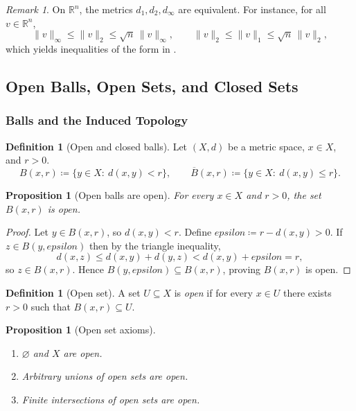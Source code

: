 \documentclass[12pt]{article}
\numberwithin{equation}{section}
\def\eps{epsilon}
\newcommand{\RR}{\mathbb{R}}
\let\emptyset\varnothing
\newcommand{\eps}{\varepsilon}               %
\theoremstyle{plain}
\newtheorem{proposition}[theorem]{Proposition}
\theoremstyle{definition}
\newtheorem{definition}[theorem]{Definition}
\theoremstyle{remark}
\newtheorem{remark}[theorem]{Remark}
\begin{document}
\begin{remark}
On $\RR^n$, the metrics $d_1,d_2,d_\infty$ are equivalent.
For instance, for all $v\in\RR^n$,
\[
\|v\|_\infty \le \|v\|_2 \le \sqrt{n}\,\|v\|_\infty,
\qquad
\|v\|_2 \le \|v\|_1 \le \sqrt{n}\,\|v\|_2,
\]
which yields inequalities of the form in .
\end{remark}

\subsection{Open Balls, Open Sets, and Closed Sets}

\subsubsection{Balls and the Induced Topology}

\begin{definition}[Open and closed balls]\label{ms:def:ball}
Let $(X,d)$ be a metric space, $x\in X$, and $r>0$.
\[
B(x,r)\coloneqq \{y\in X:\ d(x,y)<r\},\qquad
\overline{B}(x,r)\coloneqq \{y\in X:\ d(x,y)\le r\}.
\]
\end{definition}

\begin{proposition}[Open balls are open]\label{ms:prop:balls-open}
For every $x\in X$ and $r>0$, the set $B(x,r)$ is open.
\end{proposition}

\begin{proof}
Let $y\in B(x,r)$, so $d(x,y)<r$. Define $\eps\coloneqq r-d(x,y)>0$.
If $z\in B(y,\eps)$ then by the triangle inequality,
\[
d(x,z)\le d(x,y)+d(y,z)<d(x,y)+\eps=r,
\]
so $z\in B(x,r)$. Hence $B(y,\eps)\subseteq B(x,r)$, proving $B(x,r)$ is open.
\end{proof}

\begin{definition}[Open set]\label{ms:def:open-set}
A set $U\subseteq X$ is \emph{open} if for every $x\in U$ there exists $r>0$ such that $B(x,r)\subseteq U$.
\end{definition}

\begin{proposition}[Open set axioms]\label{ms:prop:open-axioms}
\begin{enumerate}[label=(\alph*)]
\item $\emptyset$ and $X$ are open.
\item Arbitrary unions of open sets are open.
\item Finite intersections of open sets are open.
\end{enumerate}
\end{proposition}
\end{document}
